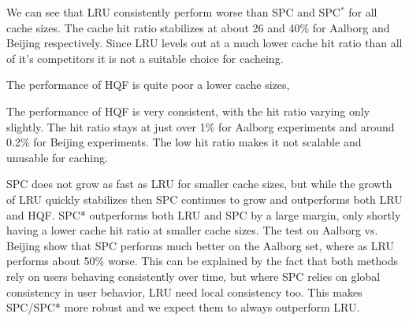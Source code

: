 {\color{red}
We can see that LRU consistently perform worse than SPC and SPC$^*$ for all cache sizes. The cache hit ratio stabilizes at about 26 and 40\% for Aalborg and Beijing respectively. Since LRU levels out at a much lower cache hit ratio than all of it's competitors it is not a suitable choice for \spath cacheing.


The performance of HQF is quite poor a lower cache sizes, 

The performance of HQF is very consistent, with the hit ratio varying only slightly. The hit ratio stays at just over 1\% for Aalborg experiments and around 0.2\% for Beijing experiments. The low hit ratio makes it not scalable and unusable for \spath caching.
}

SPC does not grow as fast as LRU for smaller cache sizes, but while the growth of LRU quickly stabilizes then SPC continues to grow and outperforms both LRU and HQF.
SPC* outperforms both LRU and SPC by a large margin, only shortly having a lower cache hit ratio at smaller cache sizes. The test on Aalborg vs. Beijing  show that SPC performs much better on the Aalborg set, where as LRU performs about 50\% worse. This can be explained by the fact that both methods rely on users behaving consistently over time, but where SPC relies on global consistency in user behavior, LRU need local consistency too. This makes SPC/SPC* more robust and we expect them to always outperform LRU.



